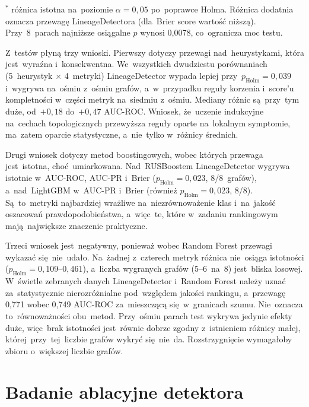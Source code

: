 \documentclass[polish,master,a4paper,oneside]{ppfcmthesis}
\renewcommand{\_}{\origtextunderscore\ifmmode\else\allowbreak\fi}
\begin{document}
\begin{table}[ht]
\vspace{0.5em}
\footnotesize $^{*}$ różnica istotna na~poziomie $\alpha = 0{,}05$ po~poprawce
Holma. Różnica dodatnia oznacza przewagę LineageDetectora (dla~Brier score
wartość niższą). Przy~8~parach najniższe osiągalne $p$ wynosi 0{,}0078,
co~ogranicza moc testu.
\end{table}

Z~testów płyną trzy wnioski. Pierwszy dotyczy przewagi nad~heurystykami,
która jest~wyraźna i~konsekwentna.
We~wszystkich dwudziestu porównaniach (5~heurystyk $\times$ 4~metryki)
LineageDetector wypada lepiej przy~$p_{\mathrm{Holm}} = 0{,}039$ i~wygrywa
na~ośmiu z~ośmiu grafów, a~w~przypadku reguły korzenia i~score'u kompletności
w~części metryk na~siedmiu z~ośmiu. Mediany różnic są~przy~tym duże,
od~$+0{,}18$ do~$+0{,}47$ AUC-ROC. Wniosek, że~uczenie indukcyjne na~cechach
topologicznych przewyższa reguły oparte na~lokalnym symptomie, ma~zatem
oparcie statystyczne, a~nie~tylko w~różnicy średnich.

Drugi wniosek dotyczy metod boostingowych, wobec których przewaga jest~istotna,
choć~umiarkowana.
Nad~RUSBoostem LineageDetector wygrywa istotnie w~AUC-ROC, AUC-PR i~Brier
($p_{\mathrm{Holm}} = 0{,}023$, 8/8~grafów), a~nad~LightGBM w~AUC-PR i~Brier
(również $p_{\mathrm{Holm}} = 0{,}023$, 8/8). Są~to~metryki
najbardziej wrażliwe na~niezrównoważenie klas i~na~jakość oszacowań
prawdopodobieństwa, a~więc~te, które w~zadaniu rankingowym mają~największe
znaczenie praktyczne.

Trzeci wniosek jest~negatywny, ponieważ wobec Random Forest przewagi wykazać
się~nie~udało. Na~żadnej z~czterech metryk różnica nie~osiąga istotności
($p_{\mathrm{Holm}} = 0{,}109$--$0{,}461$), a~liczba wygranych grafów
(5--6~na~8) jest~bliska losowej. W~świetle zebranych danych LineageDetector
i~Random Forest należy uznać za~statystycznie nierozróżnialne
pod~względem jakości rankingu, a~przewagę 0{,}771 wobec 0{,}749 AUC-ROC
za~mieszczącą się~w~granicach szumu. Nie~oznacza to~równoważności obu~metod.
Przy~ośmiu parach test wykrywa jedynie efekty duże, więc~brak istotności
jest~równie dobrze zgodny z~istnieniem różnicy małej, której~przy~tej~liczbie
grafów wykryć się~nie~da. Rozstrzygnięcie wymagałoby zbioru o~większej
liczbie grafów.

\section{Badanie ablacyjne detektora}
\label{sec:ablacja}
\end{document}
